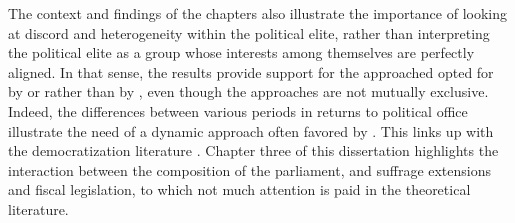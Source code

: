 The context and findings of the chapters also illustrate the importance of looking at discord and heterogeneity within the political elite, rather than interpreting the political elite as a group whose interests among themselves are perfectly aligned. In that sense, the results provide support for the approached opted for by \cite{lizzeri2004did} or \cite{llavador2005partisan} rather than by \cite{acemoglu2013political}, even though the approaches are not mutually exclusive. Indeed, the differences between various periods in returns to political office illustrate the need of a dynamic approach often favored by \cite{acemoglu2013political}. This links up with the democratization literature \citep[see e.g.][]{acemoglu2000did, acemoglu2008oligarchic,aidt2019motivates}. Chapter three of this dissertation highlights the interaction between the composition of the parliament, and suffrage extensions and fiscal legislation, to which not much attention is paid in the theoretical literature. 



